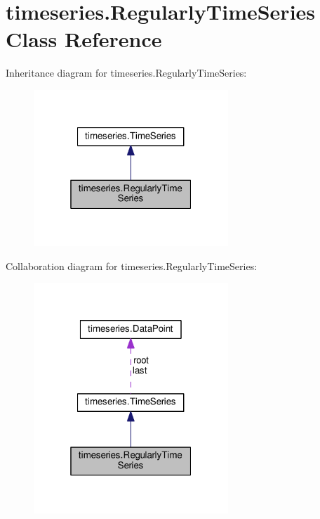 \hypertarget{classtimeseries_1_1_regularly_time_series}{}\section{timeseries.\+Regularly\+Time\+Series Class Reference}
\label{classtimeseries_1_1_regularly_time_series}


Inheritance diagram for timeseries.\+Regularly\+Time\+Series\+:
\nopagebreak
\begin{figure}[H]
\begin{center}
\leavevmode
\includegraphics[width=208pt]{classtimeseries_1_1_regularly_time_series__inherit__graph}
\end{center}
\end{figure}


Collaboration diagram for timeseries.\+Regularly\+Time\+Series\+:
\nopagebreak
\begin{figure}[H]
\begin{center}
\leavevmode
\includegraphics[width=208pt]{classtimeseries_1_1_regularly_time_series__coll__graph}
\end{center}
\end{figure}
